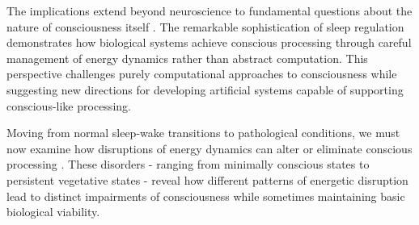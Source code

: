 The implications extend beyond neuroscience to fundamental questions about the nature of consciousness itself \cite{Krueger2016}. The remarkable sophistication of sleep regulation demonstrates how biological systems achieve conscious processing through careful management of energy dynamics rather than abstract computation. This perspective challenges purely computational approaches to consciousness while suggesting new directions for developing artificial systems capable of supporting conscious-like processing.

Moving from normal sleep-wake transitions to pathological conditions, we must now examine how disruptions of energy dynamics can alter or eliminate conscious processing \cite{Mander2017}. These disorders - ranging from minimally conscious states to persistent vegetative states - reveal how different patterns of energetic disruption lead to distinct impairments of consciousness while sometimes maintaining basic biological viability.